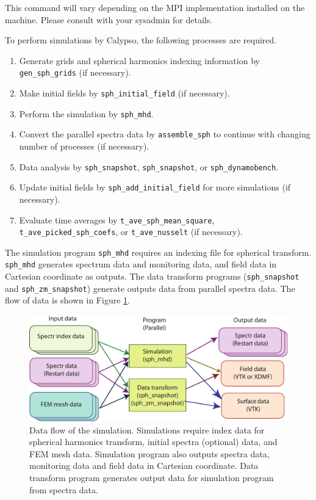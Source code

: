 This command will vary depending on the MPI implementation installed on the machine.  Please consult with your sysadmin for details.

%
To perform simulations by Calypso, the following processes are required.
%
\begin{enumerate}
\item Generate grids and spherical harmonics indexing information by \\
\verb|gen_sph_grids| (if necessary).
\item Make initial fields by \verb|sph_initial_field| (if necessary). 
\item Perform the simulation by \verb|sph_mhd|.
\item Convert the parallel spectra data by \verb|assemble_sph| to continue with changing number of processes (if necessary).
\item Data analysis by \verb|sph_snapshot|, \verb|sph_snapshot|, or \verb|sph_dynamobench|.
\item Update initial fields by \verb|sph_add_initial_field| for more simulations (if necessary).
\item Evaluate time averages by \verb|t_ave_sph_mean_square|, \verb|t_ave_picked_sph_coefs|, or \verb|t_ave_nusselt| (if necessary).
\end{enumerate}
%
The simulation program \verb|sph_mhd| requires an indexing file for spherical transform.  \verb|sph_mhd| generates spectrum data and monitoring data, and field data in Cartesian coordinate as outputs. The data transform programs (\verb|sph_snapshot| and \verb|sph_zm_snapshot|) generate outputs data  from parallel spectra data. The flow of data is shown in Figure \ref{fig:flow_0}. 
%
\begin{figure}[H]
\begin{center}
\includegraphics*[width=130mm]{images/flow_0}
\end{center}
\caption{Data flow of the simulation. Simulations require index data for spherical harmonics transform, initial spectra (optional) data, and FEM mesh data. Simulation program also outputs spectra data, monitoring data and  field data in Cartesian coordinate. Data transform program generates output data for simulation program from spectra data.}
\label{fig:flow_0}
\end{figure}
%

